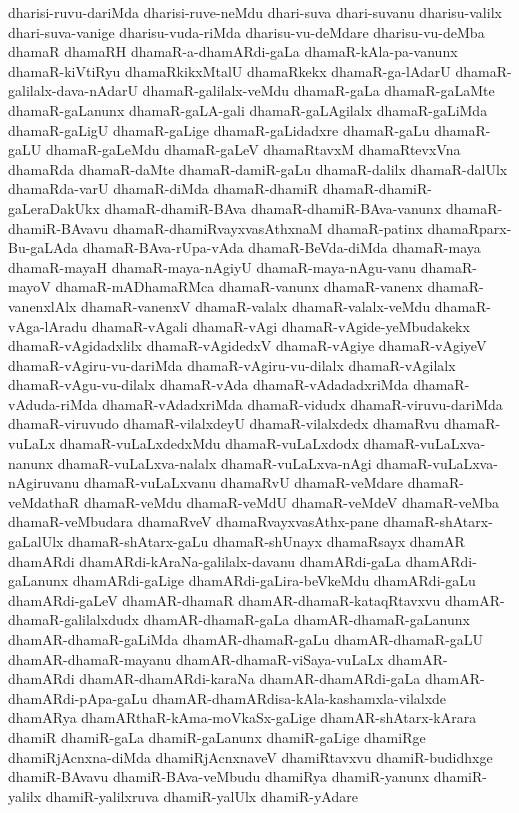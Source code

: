 {dharisi-ruvu-dariMda
dharisi-ruve-neMdu
dhari-suva
dhari-suvanu
dharisu-valilx
dhari-suva-vanige
dharisu-vuda-riMda
dharisu-vu-deMdare
dharisu-vu-deMba
dhamaR
dhamaRH
dhamaR-a-dhamARdi-gaLa
dhamaR-kAla-pa-vanunx
dhamaR-kiVtiRyu
dhamaRkikxMtalU
dhamaRkekx
dhamaR-ga-lAdarU
dhamaR-galilalx-dava-nAdarU
dhamaR-galilalx-veMdu
dhamaR-gaLa
dhamaR-gaLaMte
dhamaR-gaLanunx
dhamaR-gaLA-gali
dhamaR-gaLAgilalx
dhamaR-gaLiMda
dhamaR-gaLigU
dhamaR-gaLige
dhamaR-gaLidadxre
dhamaR-gaLu
dhamaR-gaLU
dhamaR-gaLeMdu
dhamaR-gaLeV
dhamaRtavxM
dhamaRtevxVna
dhamaRda
dhamaR-daMte
dhamaR-damiR-gaLu
dhamaR-dalilx
dhamaR-dalUlx
dhamaRda-varU
dhamaR-diMda
dhamaR-dhamiR
dhamaR-dhamiR-gaLeraDakUkx
dhamaR-dhamiR-BAva
dhamaR-dhamiR-BAva-vanunx
dhamaR-dhamiR-BAvavu
dhamaR-dhamiRvayxvasAthxnaM
dhamaR-patinx
dhamaRparx-Bu-gaLAda
dhamaR-BAva-rUpa-vAda
dhamaR-BeVda-diMda
dhamaR-maya
dhamaR-mayaH
dhamaR-maya-nAgiyU
dhamaR-maya-nAgu-vanu
dhamaR-mayoV
dhamaR-mADhamaRMca
dhamaR-vanunx
dhamaR-vanenx
dhamaR-vanenxlAlx
dhamaR-vanenxV
dhamaR-valalx
dhamaR-valalx-veMdu
dhamaR-vAga-lAradu
dhamaR-vAgali
dhamaR-vAgi
dhamaR-vAgide-yeMbudakekx
dhamaR-vAgidadxlilx
dhamaR-vAgidedxV
dhamaR-vAgiye
dhamaR-vAgiyeV
dhamaR-vAgiru-vu-dariMda
dhamaR-vAgiru-vu-dilalx
dhamaR-vAgilalx
dhamaR-vAgu-vu-dilalx
dhamaR-vAda
dhamaR-vAdadadxriMda
dhamaR-vAduda-riMda
dhamaR-vAdadxriMda
dhamaR-vidudx
dhamaR-viruvu-dariMda
dhamaR-viruvudo
dhamaR-vilalxdeyU
dhamaR-vilalxdedx
dhamaRvu
dhamaR-vuLaLx
dhamaR-vuLaLxdedxMdu
dhamaR-vuLaLxdodx
dhamaR-vuLaLxva-nanunx
dhamaR-vuLaLxva-nalalx
dhamaR-vuLaLxva-nAgi
dhamaR-vuLaLxva-nAgiruvanu
dhamaR-vuLaLxvanu
dhamaRvU
dhamaR-veMdare
dhamaR-veMdathaR
dhamaR-veMdu
dhamaR-veMdU
dhamaR-veMdeV
dhamaR-veMba
dhamaR-veMbudara
dhamaRveV
dhamaRvayxvasAthx-pane
dhamaR-shAtarx-gaLalUlx
dhamaR-shAtarx-gaLu
dhamaR-shUnayx
dhamaRsayx
dhamAR
dhamARdi
dhamARdi-kAraNa-galilalx-davanu
dhamARdi-gaLa
dhamARdi-gaLanunx
dhamARdi-gaLige
dhamARdi-gaLira-beVkeMdu
dhamARdi-gaLu
dhamARdi-gaLeV
dhamAR-dhamaR
dhamAR-dhamaR-kataqRtavxvu
dhamAR-dhamaR-galilalxdudx
dhamAR-dhamaR-gaLa
dhamAR-dhamaR-gaLanunx
dhamAR-dhamaR-gaLiMda
dhamAR-dhamaR-gaLu
dhamAR-dhamaR-gaLU
dhamAR-dhamaR-mayanu
dhamAR-dhamaR-viSaya-vuLaLx
dhamAR-dhamARdi
dhamAR-dhamARdi-karaNa
dhamAR-dhamARdi-gaLa
dhamAR-dhamARdi-pApa-gaLu
dhamAR-dhamARdisa-kAla-kashamxla-vilalxde
dhamARya
dhamARthaR-kAma-moVkaSx-gaLige
dhamAR-shAtarx-kArara
dhamiR
dhamiR-gaLa
dhamiR-gaLanunx
dhamiR-gaLige
dhamiRge
dhamiRjAcnxna-diMda
dhamiRjAcnxnaveV
dhamiRtavxvu
dhamiR-budidhxge
dhamiR-BAvavu
dhamiR-BAva-veMbudu
dhamiRya
dhamiR-yanunx
dhamiR-yalilx
dhamiR-yalilxruva
dhamiR-yalUlx
dhamiR-yAdare
}
